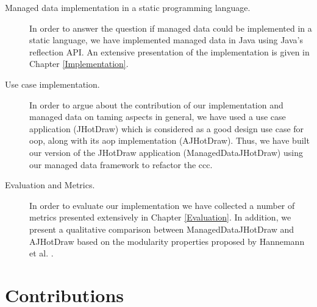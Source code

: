 \begin{description}

  \item[Managed data implementation in a static programming language.]
  In order to answer the question if managed data could be implemented in a static language, we have implemented managed data in Java using Java's reflection API. 
  An extensive presentation of the implementation is given in Chapter \ref{Implementation}.

  \item[Use case implementation.] 
  In order to argue about the contribution of our implementation and managed data on taming aspects in general, we have used a use case application (JHotDraw) which is considered as a good design use case for \ac{oop}, along with its \ac{aop} implementation (AJHotDraw).
  Thus, we have built our version of the JHotDraw application (ManagedDataJHotDraw) using our managed data framework to refactor the \ac{ccc}.

  \item[Evaluation and Metrics.]
  In order to evaluate our implementation we have collected a number of metrics presented extensively in Chapter \ref{Evaluation}.
  In addition, we present a qualitative comparison between ManagedDataJHotDraw and AJHotDraw based on the modularity properties proposed by Hannemann et al. \cite{hannemann2005role}.

\end{description}	

\section{Contributions}\label{Contributions}

